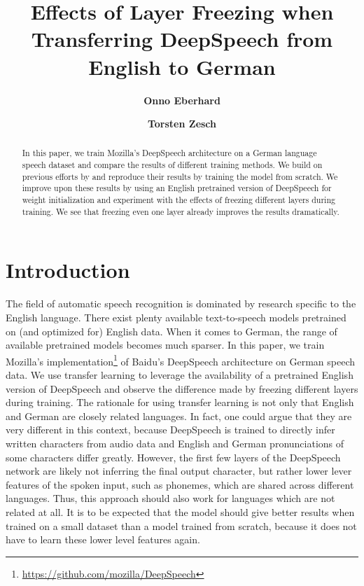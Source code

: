 \documentclass[12pt]{article}    %
\title{Effects of Layer Freezing when Transferring DeepSpeech from English to German}
\author[1]{\textbf{Onno Eberhard}}
\author[ ]{\textbf{Torsten Zesch}}
\affil[ ]{Language Technology Lab}
\affil[ ]{University of Duisburg-Essen}
\affil[1]{\href{mailto:onno.eberhard@stud.uni-due.de}{\texttt{onno.eberhard@stud.uni-due.de}}}
\date{}
\begin{document}
\maketitle

\begin{abstract}\noindent
In this paper, we train Mozilla's DeepSpeech architecture on a German language speech dataset and compare the results of different training methods. We build on previous efforts by \textcite{agarwal-zesch-2019-german} and reproduce their results by training the model from scratch. We improve upon these results by using an English pretrained version of DeepSpeech for weight initialization and experiment with the effects of freezing different layers during training. We see that freezing even one layer already improves the results dramatically.
\end{abstract}

\section{Introduction}
The field of automatic speech recognition is dominated by research specific to the English language. There exist plenty available text-to-speech models pretrained on (and optimized for) English data. When it comes to German, the range of available pretrained models becomes much sparser. In this paper, we train Mozilla's implementation\footnote{\url{https://github.com/mozilla/DeepSpeech}} of Baidu's DeepSpeech architecture \parencite{hannun2014deep} on German speech data. We use transfer learning to leverage the availability of a pretrained English version of DeepSpeech and observe the difference made by freezing different layers during training. The rationale for using transfer learning is not only that English and German are closely related languages. In fact, one could argue that they are very different in this context, because DeepSpeech is trained to directly infer written characters from audio data and English and German pronunciations of some characters differ greatly. However, the first few layers of the DeepSpeech network are likely not inferring the final output character, but rather lower lever features of the spoken input, such as phonemes, which are shared across different languages. Thus, this approach should also work for languages which are not related at all. It is to be expected that the model should give better results when trained on a small dataset than a model trained from scratch, because it does not have to learn these lower level features again.
\end{document}
